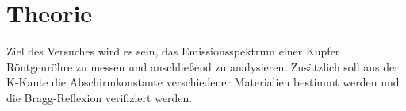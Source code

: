\section{Theorie}
\label{sec:Theorie}

Ziel des Versuches wird es sein, das Emissionsspektrum einer Kupfer Röntgenröhre 
zu messen und anschließend zu analysieren. Zusätzlich soll aus der K-Kante 
die Abschirmkonstante verschiedener Materialien bestimmt werden und die 
Bragg-Reflexion verifiziert werden.